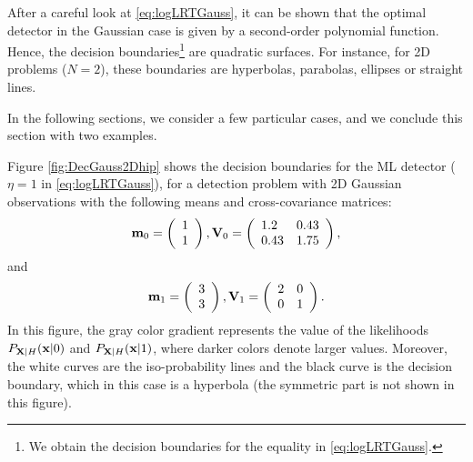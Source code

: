 After a careful look at \eqref{eq:logLRTGauss}, it can be shown that the optimal detector in the Gaussian case is given by a second-order polynomial function. Hence, the decision boundaries\footnote{We obtain the decision boundaries for the equality in \eqref{eq:logLRTGauss}.} are quadratic surfaces. For instance, for 2D problems ($N = 2$), these boundaries are hyperbolas, parabolas, ellipses or straight lines.

In the following sections, we consider a few particular cases, and we conclude this section with two examples.

\begin{example}
	Figure \ref{fig:DecGauss2Dhip} shows the decision boundaries for the ML detector ($\eta = 1$ in \eqref{eq:logLRTGauss}), for a detection problem with 2D Gaussian observations with the following means and cross-covariance matrices:
	\begin{equation*}
	{\bf m}_0 =  \left(\begin{array}{l}  1 \\ 1 \end{array}\right), {\bf V}_0 = 
	\left(\begin{array}{ll} 1.2 & 0.43 \\ 0.43 & 1.75 \end{array} \right),
	\end{equation*}
	and
	\begin{equation*}
	{\bf m}_1 = \left(\begin{array}{l}  3 \\ 3 \end{array}\right), {\bf V}_1 = 
	\left(\begin{array}{ll} 2 & 0 \\ 0 & 1 \end{array} \right).
	\end{equation*}
	In this figure, the gray color gradient  represents the value of the likelihoods $P_{{\bf X}|H}({\bf x}|0)$ and $P_{{\bf X}|H}({\bf x}|1)$, where darker colors denote larger values. Moreover, the white curves are the iso-probability lines and the black curve is the decision boundary, which in this case is a hyperbola (the symmetric part is not shown in this figure).
	

\end{example}
